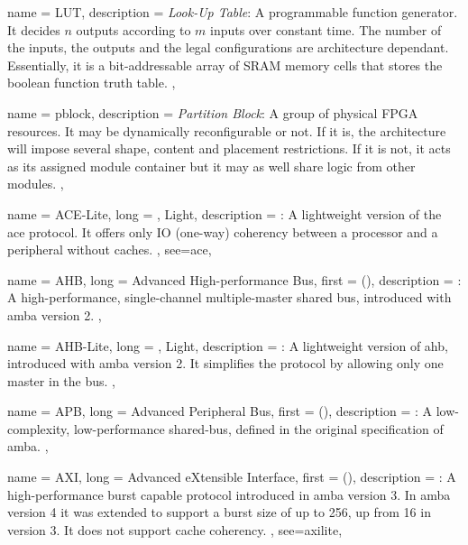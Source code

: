 {
	name = {LUT},
	description = {\emph{Look-Up Table}: 
		A programmable function generator. It decides $n$ outputs according to $m$ inputs
		over constant time. 
		The number of the inputs, the outputs and the legal configurations
		are architecture dependant. 
		Essentially, it is a bit-addressable array of SRAM memory cells
		that stores the boolean function truth table.
	},
}

{
	name = {pblock},
	description = {\emph{Partition Block}:
		A group of physical FPGA resources. It may be dynamically reconfigurable or not.
		If it is, the architecture will impose several shape, content and placement restrictions.
		If it is not, it acts as its assigned module container but it may as well share logic
		from other modules.
	},
}

{
	name = {ACE-Lite},
	long = {, Light},
	description = {\emph{}:
		A lightweight version of the \gls{ace} protocol. It offers only IO (one-way) coherency
		between a processor and a peripheral without caches.
	},
	see={ace},
}


{
	name = {AHB},
	long = {Advanced High-performance Bus},
	first = { ()},
	description = {\emph{}:
		A high-performance, single-channel multiple-master shared bus, 
		introduced with \gls{amba} version 2.
	},
}


{
	name = {AHB-Lite},
	long = {, Light},
	description = {\emph{}:
		A lightweight version of \gls{ahb}, introduced with \gls{amba} version 2.
		It simplifies the protocol by allowing only one master in the bus.
	},
}


{
	name = {APB},
	long = {Advanced Peripheral Bus},
	first = { ()},
	description = {\emph{}:
		A low-complexity, low-performance shared-bus, defined in the original
		specification of \gls{amba}.
	},
}


{
	name = {AXI},
	long = {Advanced eXtensible Interface},
	first = { ()},
	description = {\emph{}:
		A high-performance \gls{burst} capable protocol introduced in \gls{amba} version 3.
		In \gls{amba} version 4 it was extended to support a \gls{burst} size of up to 256,
		up from 16 in version 3. It does not support cache coherency.
	},
	see={axilite},
}


